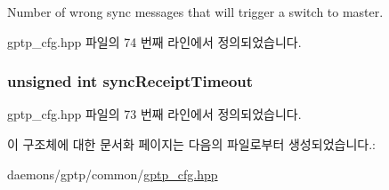 Number of wrong sync messages that will trigger a switch to master. 



gptp\+\_\+cfg.\+hpp 파일의 74 번째 라인에서 정의되었습니다.

\subsubsection[{\texorpdfstring{sync\+Receipt\+Timeout}{syncReceiptTimeout}}]{\setlength{\rightskip}{0pt plus 5cm}unsigned int sync\+Receipt\+Timeout}\hypertarget{struct_gptp_ini_parser_1_1gptp__cfg__t_acdbb968dbfdc1d76285faa1973de3320}{}\label{struct_gptp_ini_parser_1_1gptp__cfg__t_acdbb968dbfdc1d76285faa1973de3320}


gptp\+\_\+cfg.\+hpp 파일의 73 번째 라인에서 정의되었습니다.



이 구조체에 대한 문서화 페이지는 다음의 파일로부터 생성되었습니다.\+:\begin{DoxyCompactItemize}
\item 
daemons/gptp/common/\hyperlink{gptp__cfg_8hpp}{gptp\+\_\+cfg.\+hpp}\end{DoxyCompactItemize}
